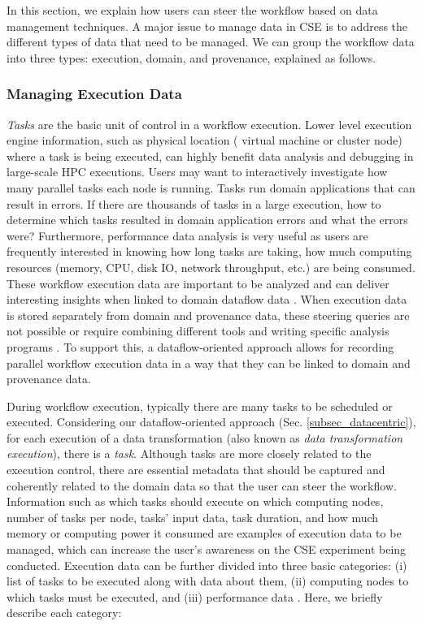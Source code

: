 In this section, we explain how users can steer the workflow based on data management techniques.
A major issue to manage data in CSE is to address the different types of data that need to be managed.
We can group the workflow data into three types: execution,
domain, and provenance, explained as follows.


\subsubsection{Managing Execution Data}

\textit{Tasks} are the basic unit of control in a workflow execution.
Lower level execution engine information, such as physical location (\ie{} virtual machine or cluster node) where a task is being executed, can highly benefit data analysis and debugging in large-scale HPC executions.
Users may want to interactively investigate how many parallel tasks each node is running.
Tasks run domain applications that can result in errors. If there are thousands of tasks in a large execution, how to determine which tasks resulted in domain application errors and what the errors were?
Furthermore, performance data analysis is very useful as users are frequently interested in knowing how long tasks are taking, how much computing resources (memory, CPU, disk IO, network throughput, etc.) are being consumed.
These workflow execution data are important to be analyzed and can deliver interesting insights when linked to domain dataflow data \cite{silva_adding_2018,Souza2015Monitoramento}.
When execution data is stored separately from domain and provenance data, these steering queries are not possible or require combining different tools and writing specific analysis programs \cite{Silva2017Raw}.
To support this, a dataflow-oriented approach allows for recording parallel workflow execution data in a way that they can be linked to domain and provenance data.

During workflow execution, typically there are many tasks to be scheduled or executed.
Considering our dataflow-oriented approach (Sec. \ref{subsec_datacentric}), for each execution of a data transformation (also known as \textit{data transformation execution}), there is a \textit{task}. Although tasks are more closely related to the execution control, there are essential metadata that should be captured and coherently related to the domain data so that the user can steer the workflow. Information such as which tasks should execute on which
computing nodes, number of tasks per node, tasks' input data, task
duration, and how much memory or computing power it consumed are
examples of execution data to be managed, which can increase the user's awareness on the CSE experiment being conducted. Execution data can be further divided into three basic categories: (i)
list of tasks to be executed along with data about them, (ii) computing
nodes to which tasks must be executed, and (iii) performance data
\cite{Ogasawara2011algebraic,Oliveira2010SciCumulus:,silva_adding_2018,Souza2015Monitoramento}. Here, we briefly describe each category:

